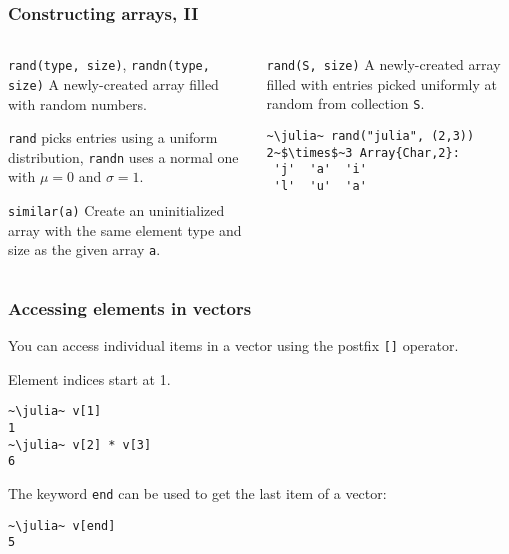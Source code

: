 \documentclass[english,serif,mathserif,xcolor=pdftex,dvipsnames,table]{beamer}
\begin{document}
\begin{frame}[fragile]
  \frametitle{Constructing arrays, II}
  \begin{columns}
    \small
    \begin{column}{0.5\textwidth}
      \raggedright

      \begin{describe}{\texttt{rand(type, size)}, \texttt{randn(type, size)}}
        A newly-created array filled with random numbers.

        \+
        \texttt{rand} picks entries using a uniform distribution,
        \texttt{randn} uses a normal one with $\mu=0$ and $\sigma=1$.
      \end{describe}

      \+
      \begin{describe}{\texttt{similar(a)}}
        Create an uninitialized array with the same element type and
        size as the given array \texttt{a}.
      \end{describe}
    \end{column}
    \begin{column}{0.5\textwidth}
      \raggedright

      \begin{describe}{\texttt{rand(S, size)}}
        A newly-created array filled with entries picked uniformly at
        random from collection \texttt{S}.
\begin{lstlisting}
~\julia~ rand("julia", (2,3))
2~$\times$~3 Array{Char,2}:
 'j'  'a'  'i'
 'l'  'u'  'a'
\end{lstlisting}
      \end{describe}
    \end{column}
  \end{columns}
\end{frame}


\begin{frame}[fragile]
  \frametitle{Accessing elements in vectors}
  You can access individual items in a vector using the postfix
  \texttt{[]} operator.

  \+
  Element indices start at 1.

\begin{lstlisting}
~\julia~ v[1]
1
~\julia~ v[2] * v[3]
6
\end{lstlisting}

  \+
  The keyword \texttt{end} can be used to get the last item of a vector:
\begin{lstlisting}
~\julia~ v[end]
5
\end{lstlisting}
\end{frame}
\end{document}
